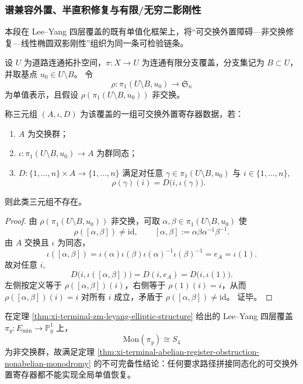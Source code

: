 \subsubsection{谱兼容外置、半直积修复与有限/无穷二影刚性}\label{subsubsec:xi-spectrum-compatible-semidirect-two-shadow-rigidity}
本段在 Lee--Yang 四层覆盖的既有单值化框架上，将“可交换外置障碍—非交换修复—线性椭圆双影刚性”组织为同一条可检验链条。

\begin{theorem}[可交换外置寄存器对非交换单值群的不可完备性]\label{thm:xi-terminal-abelian-register-obstruction-nonabelian-monodromy}
设 \(U\) 为道路连通拓扑空间，\(\pi:X\to U\) 为连通有限分支覆盖，分支集记为 \(B\subset U\)，并取基点 \(u_0\in U\setminus B\)。
令
\[
\rho:\pi_1(U\setminus B,u_0)\longrightarrow \mathfrak S_n
\]
为单值表示，且假设 \(\rho(\pi_1(U\setminus B,u_0))\) 非交换。

称三元组 \((A,\iota,D)\) 为该覆盖的一组可交换外置寄存器数据，若：
\begin{enumerate}
  \item \(A\) 为交换群；
  \item \(\iota:\pi_1(U\setminus B,u_0)\to A\) 为群同态；
  \item \(D:\{1,\dots,n\}\times A\to\{1,\dots,n\}\) 满足对任意 \(\gamma\in\pi_1(U\setminus B,u_0)\) 与 \(i\in\{1,\dots,n\}\),
  \[
  \rho(\gamma)(i)=D\bigl(i,\iota(\gamma)\bigr).
  \]
\end{enumerate}
则此类三元组不存在。
\end{theorem}
\begin{proof}
由 \(\rho(\pi_1(U\setminus B,u_0))\) 非交换，可取 \(\alpha,\beta\in\pi_1(U\setminus B,u_0)\) 使
\[
\rho([\alpha,\beta])\neq \mathrm{id},
\qquad
[\alpha,\beta]:=\alpha\beta\alpha^{-1}\beta^{-1}.
\]
由 \(A\) 交换且 \(\iota\) 为同态，
\[
\iota([\alpha,\beta])
=\iota(\alpha)\iota(\beta)\iota(\alpha)^{-1}\iota(\beta)^{-1}
=e_A
=\iota(1).
\]
故对任意 \(i\),
\[
D\bigl(i,\iota([\alpha,\beta])\bigr)=D(i,e_A)=D\bigl(i,\iota(1)\bigr).
\]
左侧按定义等于 \(\rho([\alpha,\beta])(i)\)，右侧等于 \(\rho(1)(i)=i\)，从而 \(\rho([\alpha,\beta])(i)=i\) 对所有 \(i\) 成立，矛盾于 \(\rho([\alpha,\beta])\neq\mathrm{id}\)。
证毕。
\end{proof}



\begin{corollary}\label{cor:xi-terminal-abelian-register-obstruction-leyang-s4}
在定理 \ref{thm:xi-terminal-zm-leyang-elliptic-structure} 给出的 Lee--Yang 四层覆盖 \(\pi_y:E_{\min}\to\mathbb P^1_y\) 上，
\[
\mathrm{Mon}(\pi_y)\cong S_4
\]
为非交换群，故满足定理 \ref{thm:xi-terminal-abelian-register-obstruction-nonabelian-monodromy} 的不可完备性结论：任何要求路径拼接同态化的可交换外置寄存器都不能实现全局单值恢复。
\end{corollary}

